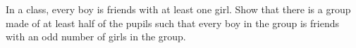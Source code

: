 In a class, every boy is friends with at least one girl. Show that there is a group made of at least half of the pupils such that every boy in the group is friends with an odd number of girls in the group.
